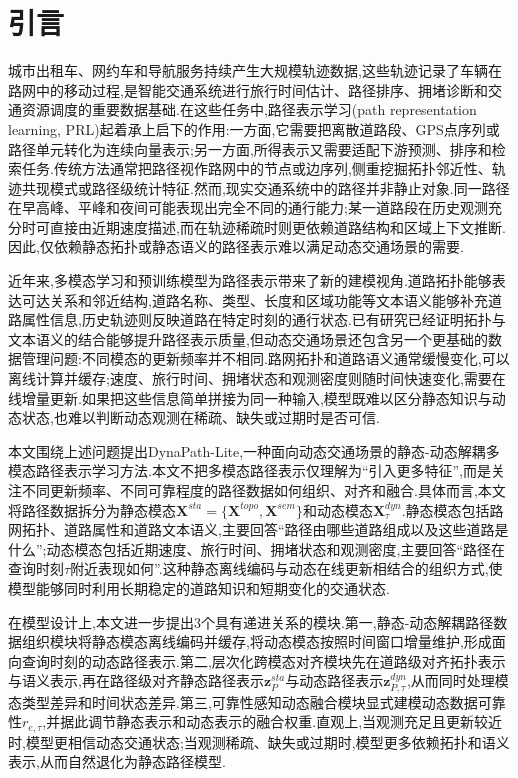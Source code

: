 \documentclass{rjthesis}
\begin{document}
\rjmaketitle

\section{引言}

城市出租车、网约车和导航服务持续产生大规模轨迹数据,这些轨迹记录了车辆在路网中的移动过程,是智能交通系统进行旅行时间估计、路径排序、拥堵诊断和交通资源调度的重要数据基础.在这些任务中,路径表示学习(path representation learning, PRL)起着承上启下的作用:一方面,它需要把离散道路段、GPS点序列或路径单元转化为连续向量表示;另一方面,所得表示又需要适配下游预测、排序和检索任务.传统方法通常把路径视作路网中的节点或边序列,侧重挖掘拓扑邻近性、轨迹共现模式或路径级统计特征.然而,现实交通系统中的路径并非静止对象.同一路径在早高峰、平峰和夜间可能表现出完全不同的通行能力;某一道路段在历史观测充分时可直接由近期速度描述,而在轨迹稀疏时则更依赖道路结构和区域上下文推断.因此,仅依赖静态拓扑或静态语义的路径表示难以满足动态交通场景的需要.

近年来,多模态学习和预训练模型为路径表示带来了新的建模视角.道路拓扑能够表达可达关系和邻近结构,道路名称、类型、长度和区域功能等文本语义能够补充道路属性信息,历史轨迹则反映道路在特定时刻的通行状态.已有研究已经证明拓扑与文本语义的结合能够提升路径表示质量\cite{wei2025pathllm},但动态交通场景还包含另一个更基础的数据管理问题:不同模态的更新频率并不相同.路网拓扑和道路语义通常缓慢变化,可以离线计算并缓存;速度、旅行时间、拥堵状态和观测密度则随时间快速变化,需要在线增量更新.如果把这些信息简单拼接为同一种输入,模型既难以区分静态知识与动态状态,也难以判断动态观测在稀疏、缺失或过期时是否可信.

本文围绕上述问题提出DynaPath-Lite,一种面向动态交通场景的静态-动态解耦多模态路径表示学习方法.本文不把多模态路径表示仅理解为``引入更多特征'',而是关注不同更新频率、不同可靠程度的路径数据如何组织、对齐和融合.具体而言,本文将路径数据拆分为静态模态$\mathbf{X}^{sta}=\{\mathbf{X}^{topo},\mathbf{X}^{sem}\}$和动态模态$\mathbf{X}^{dyn}_{\tau}$.静态模态包括路网拓扑、道路属性和道路文本语义,主要回答``路径由哪些道路组成以及这些道路是什么'';动态模态包括近期速度、旅行时间、拥堵状态和观测密度,主要回答``路径在查询时刻$\tau$附近表现如何''.这种静态离线编码与动态在线更新相结合的组织方式,使模型能够同时利用长期稳定的道路知识和短期变化的交通状态.

在模型设计上,本文进一步提出3个具有递进关系的模块.第一,静态-动态解耦路径数据组织模块将静态模态离线编码并缓存,将动态模态按照时间窗口增量维护,形成面向查询时刻的动态路径表示.第二,层次化跨模态对齐模块先在道路级对齐拓扑表示与语义表示,再在路径级对齐静态路径表示$\mathbf{z}^{sta}_{P}$与动态路径表示$\mathbf{z}^{dyn}_{P,\tau}$,从而同时处理模态类型差异和时间状态差异.第三,可靠性感知动态融合模块显式建模动态数据可靠性$r_{e,\tau}$,并据此调节静态表示和动态表示的融合权重.直观上,当观测充足且更新较近时,模型更相信动态交通状态;当观测稀疏、缺失或过期时,模型更多依赖拓扑和语义表示,从而自然退化为静态路径模型.
\end{document}
